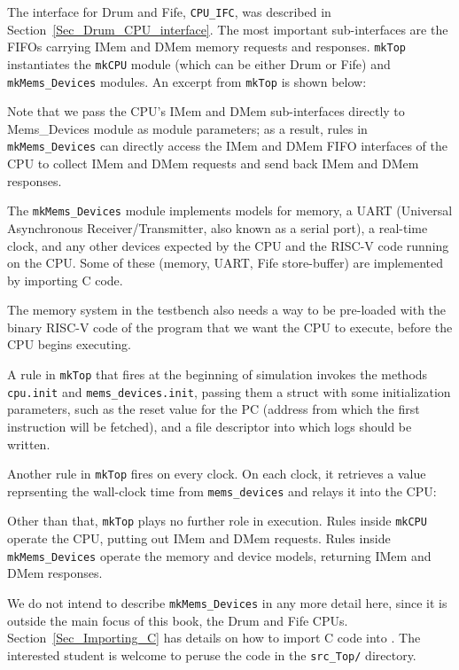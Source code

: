 The interface for Drum and Fife, \verb|CPU_IFC|, was described in
Section~\ref{Sec_Drum_CPU_interface}.  The most important
sub-interfaces are the FIFOs carrying IMem and DMem memory requests
and responses.  \verb|mkTop| instantiates the \verb|mkCPU| module
(which can be either Drum or Fife) and \verb|mkMems_Devices| modules.
An excerpt from \verb|mkTop| is shown below:


Note that we pass the CPU's IMem and DMem sub-interfaces directly to
Mems\_Devices module as module parameters; as a result, rules in
\verb|mkMems_Devices| can directly access the IMem and DMem FIFO
interfaces of the CPU to collect IMem and DMem requests and send back
IMem and DMem responses.

The \verb|mkMems_Devices| module implements models for memory, a UART
(Universal Asynchronous Receiver/Transmitter, also known as a serial
port), a real-time clock, and any other devices expected by the CPU
and the RISC-V code running on the CPU.  Some of these (memory, UART,
Fife store-buffer) are implemented by importing C code.

The memory system in the testbench also needs a way to be pre-loaded
with the binary RISC-V code of the program that we want the CPU to
execute, before the CPU begins executing.

A rule in \verb|mkTop| that fires at the beginning of simulation
invokes the methods \verb|cpu.init| and \verb|mems_devices.init|,
passing them a struct with some initialization parameters, such as the
reset value for the PC (address from which the first instruction will
be fetched), and a file descriptor into which logs should be written.


Another rule in \verb|mkTop| fires on every clock.  On each clock, it
retrieves a value reprsenting the wall-clock time from
\verb|mems_devices| and relays it into the CPU:


Other than that, \verb|mkTop| plays no further role in execution.
Rules inside \verb|mkCPU| operate the CPU, putting out IMem and DMem
requests.  Rules inside \verb|mkMems_Devices| operate the memory and
device models, returning IMem and DMem responses.

We do not intend to describe \verb|mkMems_Devices| in any more detail
here, since it is outside the main focus of this book, the Drum and
Fife CPUs.  Section~\ref{Sec_Importing_C} has details on how to import
C code into {\BSV}.  The interested student is welcome to peruse the code
in the \verb|src_Top/| directory.

